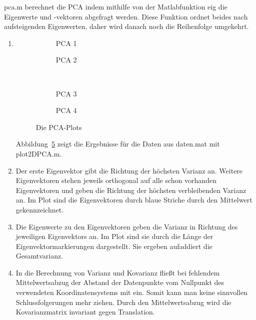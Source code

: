 \documentclass[]{report}
\newlength\figureheight
\newlength\figurewidth
\begin{document}
\begin{enumerate}
		pca.m berechnet die PCA indem mithilfe von der Matlabfunktion eig die Eigenwerte und -vektoren abgefragt werden. Diese Funktion ordnet beides nach aufsteigenden Eigenwerten, daher wird danach noch die Reihenfolge umgekehrt.
		\begin{enumerate}
			
			\item
			\setlength\figureheight{5cm}
			\setlength{}
			\begin{figure}
				\begin{subfigure}{0.45\textwidth}
					\centering
					
					\caption{PCA 1}
					\label{fig:pca1}
				\end{subfigure}
				\qquad
				\begin{subfigure}{0.45\textwidth}
					\centering
					
					\caption{PCA 2}
					\label{fig:pca2}
				\end{subfigure}	
				\\
				\begin{subfigure}{0.45\textwidth}
					\centering
					
					\caption{PCA 3}
					\label{fig:pca3}
				\end{subfigure}
				\qquad
				\begin{subfigure}{0.45\textwidth}
					\centering
					
					\caption{PCA 4}
					\label{fig:pca4}
				\end{subfigure}	
				\caption{Die PCA-Plots}
				\label{fig:pca}
			\end{figure}
			
			Abbildung~\ref{fig:pca} zeigt die Ergebnisse für die Daten aus daten.mat mit plot2DPCA.m.
			\item
			Der erste Eigenvektor gibt die Richtung der höchsten Varianz an. Weitere Eigenvektoren stehen jeweils orthogonal auf alle schon vorhanden Eigenvektoren und geben die Richtung der höchsten verbleibenden Varianz an. Im Plot sind die Eigenvektoren durch blaue Striche durch den Mittelwert gekennzeichnet.
			\item
			Die Eigenwerte zu den Eigenvektoren geben die Varianz in Richtung des jeweiligen Eigenvektors an. Im Plot sind sie durch die Länge der Eigenvektormarkierungen dargestellt. Sie ergeben aufaddiert die Gesamtvarianz.
			\item
			In die Berechnung von Varianz und Kovarianz fließt bei fehlendem Mittelwertsabzug der Abstand der Datenpunkte vom Nullpunkt des verwendeten Koordinatensystems mit ein. Somit kann man keine sinnvollen Schlussfolgerungen mehr ziehen. Durch den Mittelwertsabzug wird die Kovarianzmatrix invariant gegen Translation. 
			

\end{enumerate}
\end{enumerate}
\end{document}
